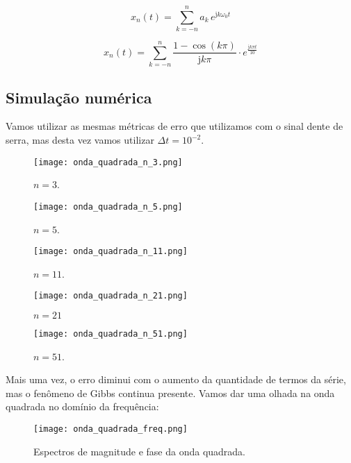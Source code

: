 \documentclass[10pt,twocolumn]{article}
\renewcommand{\j}{\ensuremath{\mathrm{j}}}
\newcommand{\?}{\stackrel{?}{=}}
\begin{document}
\begin{equation*}
	x_n(t)=\sum_{k=-n}^{n}a_k\,e^{\j k\omega_0t}
\end{equation*}

\begin{equation*}
	x_n(t)=\sum_{k=-n}^{n}\frac{1-\cos(k\pi)}{\j k\pi}\cdot e^{\frac{\j k\pi t}{10}}
\end{equation*}

\subsection{Simulação numérica}

Vamos utilizar as mesmas métricas de erro que utilizamos com o sinal dente de serra, mas desta vez vamos utilizar $\Delta t=10^{-2}$.

\FloatBarrier

\begin{figure}[h!]
	\texttt{[image: onda\_quadrada\_n\_3.png]}
	\centering
	\caption{$n=3$.}
\end{figure}

\begin{figure}[h!]
	\texttt{[image: onda\_quadrada\_n\_5.png]}
	\centering
	\caption{$n=5$.}
\end{figure}

\begin{figure}[h!]
	\texttt{[image: onda\_quadrada\_n\_11.png]}
	\centering
	\caption{$n=11$.}
\end{figure}

\begin{figure}[h!]
	\texttt{[image: onda\_quadrada\_n\_21.png]}
	\centering
	\caption{$n=21$}
\end{figure}

\begin{figure}[h!]
	\texttt{[image: onda\_quadrada\_n\_51.png]}
	\centering
	\caption{$n=51$.}
\end{figure}

\FloatBarrier

Mais uma vez, o erro diminui com o aumento da quantidade de termos da série, mas o fenômeno de Gibbs continua presente. Vamos dar uma olhada na onda quadrada no domínio da frequência:
\FloatBarrier
\begin{figure}[h!]
	\texttt{[image: onda\_quadrada\_freq.png]}
	\centering
	\caption{Espectros de magnitude e fase da onda quadrada.}
\end{figure}
\FloatBarrier
\end{document}
